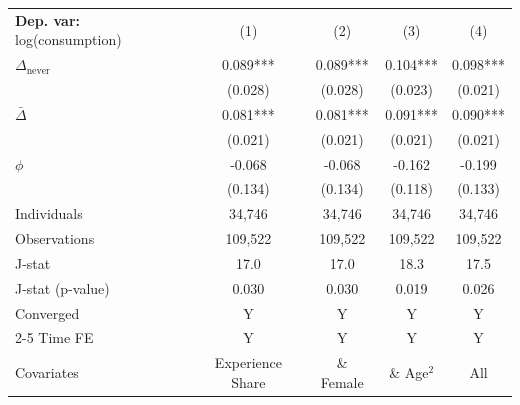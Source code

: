 \begin{tabular}{l cccc} \toprule  \textbf{Dep. var:}  log(consumption) 
                    &\multicolumn{1}{c}{(1)}   &\multicolumn{1}{c}{(2)}   &\multicolumn{1}{c}{(3)}   &\multicolumn{1}{c}{(4)}   \\

\addlinespace
$\Delta_{\text{never}}$&       0.089***&       0.089***&       0.104***&       0.098***\\
                    &     (0.028)   &     (0.028)   &     (0.023)   &     (0.021)   \\

\addlinespace
$\bar{\Delta}$      &       0.081***&       0.081***&       0.091***&       0.090***\\
                    &     (0.021)   &     (0.021)   &     (0.021)   &     (0.021)   \\

\addlinespace
$\phi$              &      -0.068   &      -0.068   &      -0.162   &      -0.199   \\
                    &     (0.134)   &     (0.134)   &     (0.118)   &     (0.133)   \\
\addlinespace
Individuals         &      34,746   &      34,746   &      34,746   &      34,746   \\
Observations        &     109,522   &     109,522   &     109,522   &     109,522   \\
J-stat              &        17.0   &        17.0   &        18.3   &        17.5   \\
J-stat (p-value)    &       0.030   &       0.030   &       0.019   &       0.026   \\
Converged           &           Y   &           Y   &           Y   &           Y   \\
\cmidrule{2-5} Time FE & Y & Y & Y & Y \\ Covariates & Experience Share & \& Female & \& Age$^2$ & All \\ \bottomrule \end{tabular}
